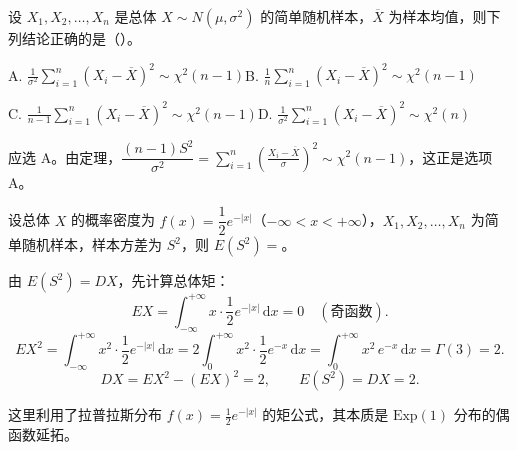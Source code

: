 \documentclass[lang=cn,11pt]{elegantbook}
\begin{document}
\begin{exercise}\label{exer:6-s2-chi2}
设 \(X_1, X_2, \dots, X_n\) 是总体 \(X \sim N(\mu, \sigma^2)\) 的简单随机样本，\(\overline{X}\) 为样本均值，则下列结论正确的是（\quad）。\par
A. \(\displaystyle\frac{1}{\sigma^2}\sum_{i=1}^{n}(X_i-\overline{X})^2 \sim \chi^2(n-1)\)\qquad B. \(\displaystyle\frac{1}{n}\sum_{i=1}^{n}(X_i-\overline{X})^2 \sim \chi^2(n-1)\)\par
C. \(\displaystyle\frac{1}{n-1}\sum_{i=1}^{n}(X_i-\overline{X})^2 \sim \chi^2(n-1)\)\qquad D. \(\displaystyle\frac{1}{\sigma^2}\sum_{i=1}^{n}(X_i-\overline{X})^2 \sim \chi^2(n)\)
\end{exercise}
\begin{solution}
应选 A。由定理，\(\dfrac{(n-1)S^2}{\sigma^2} = \displaystyle\sum_{i=1}^{n}\!\left(\frac{X_i-\overline{X}}{\sigma}\right)^{\!2} \sim \chi^2(n-1)\)，这正是选项 A。
\end{solution}

\begin{exercise}[样本方差的期望] \label{ex:statistic_05}
设总体 \(X\) 的概率密度为 \(f(x)=\dfrac{1}{2}e^{-|x|}\)（\(-\infty<x<+\infty\)），\(X_1,X_2,\dots,X_n\) 为简单随机样本，样本方差为 \(S^2\)，则 \(E(S^2)=\)\underline{\qquad}。
\end{exercise}
\begin{solution}
由 \(E(S^2)=DX\)，先计算总体矩：
\[
EX=\int_{-\infty}^{+\infty}x\cdot\frac{1}{2}e^{-|x|}\,\mathrm{d}x=0 \quad(\text{奇函数}).
\]
\[
EX^2=\int_{-\infty}^{+\infty}x^2\cdot\frac{1}{2}e^{-|x|}\,\mathrm{d}x
=2\int_0^{+\infty}x^2\cdot\frac{1}{2}e^{-x}\,\mathrm{d}x
=\int_0^{+\infty}x^2\,e^{-x}\,\mathrm{d}x=\Gamma(3)=2.
\]
\[
DX=EX^2-(EX)^2=2,\qquad E(S^2)=DX=2.
\]
\begin{note}
这里利用了拉普拉斯分布 \(f(x)=\frac{1}{2}e^{-|x|}\) 的矩公式，其本质是 \(\text{Exp}(1)\) 分布的偶函数延拓。
\end{note}
\end{solution}
\end{document}
